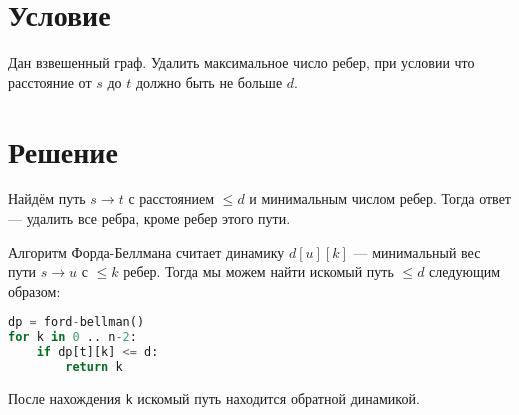 

\usepackage{listings}

\lstset{basicstyle=\ttfamily\footnotesize,breaklines=true}

\setmonofont{Inconsolata}

\cfoot{}



\section{Условие}

Дан взвешенный граф. Удалить максимальное число ребер, при условии что расстояние от $s$ до $t$ должно быть не больше $d$.

\section{Решение}

Найдём путь $s\to t$ с расстоянием $\le d$ и минимальным числом ребер. Тогда ответ --- удалить все ребра, кроме ребер этого пути.

Алгоритм Форда-Беллмана считает динамику $d[u][k]$ --- минимальный вес пути $s\to u$ с $\le k$ ребер. Тогда мы можем найти искомый путь $\le d$ следующим образом:

\begin{lstlisting}[language=Python]
dp = ford-bellman()
for k in 0 .. n-2:
    if dp[t][k] <= d:
        return k
\end{lstlisting}

После нахождения \texttt{k} искомый путь находится обратной динамикой.

